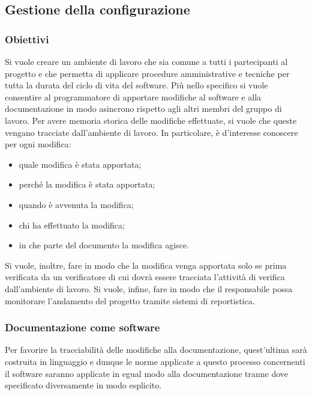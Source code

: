 \subsection{Gestione della configurazione}
    \subsubsection{Obiettivi}
    Si vuole creare un ambiente di lavoro che sia comune a tutti i partecipanti al progetto e che permetta di applicare procedure amministrative e tecniche per tutta la durata del ciclo di vita del software. Più nello specifico si vuole consentire al programmatore di apportare modifiche al software e alla documentazione in modo asincrono rispetto agli altri membri del gruppo di lavoro. Per avere memoria storica delle modifiche effettuate, si vuole che queste vengano tracciate dall'ambiente di lavoro. In particolare, è d'interesse conoscere per ogni modifica:
    \begin{itemize}
        \item quale modifica è stata apportata;
        \item perché la modifica è stata apportata;
        \item quando è avvenuta la modifica;
        \item chi ha effettuato la modifica;
        \item in che parte del documento la modifica agisce.
    \end{itemize}
    Si vuole, inoltre, fare in modo che la modifica venga apportata solo se prima verificata da un verificatore di cui dovrà essere tracciata l'attività di verifica dall'ambiente di lavoro. Si vuole, infine, fare in modo che il responsabile possa monitorare l'andamento del progetto tramite sistemi di reportistica.

    \subsubsection{Documentazione come software}
    Per favorire la tracciabilità delle modifiche alla documentazione, quest'ultima sarà costruita in linguaggio \glock{\LaTeX} e dunque le norme applicate a questo processo concernenti il software saranno applicate in egual modo alla documentazione tranne dove specificato diversamente in modo esplicito.

